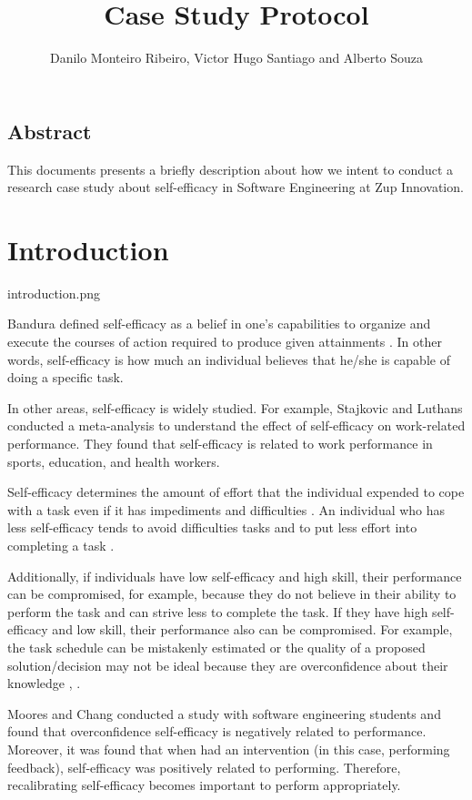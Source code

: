 \documentclass{TheMartianReport}
\title{Case Study Protocol} %
\author{Danilo Monteiro Ribeiro, Victor Hugo Santiago and Alberto Souza } %
\begin{document}

\subsection{Abstract}

This documents presents a briefly description  about how we intent to conduct a research case study about self-efficacy in Software Engineering at Zup Innovation. 

\section{Introduction}{introduction.png}

Bandura defined self-efficacy as a belief in one’s capabilities to organize and execute the courses of action required to produce given attainments \cite{bandura1977self}. In other words, self-efficacy is how much an individual believes that he/she is capable of doing a specific task.

In other areas, self-efficacy is widely studied. For example, Stajkovic and Luthans \cite{stajkovic1998self} conducted a meta-analysis to understand the effect of self-efficacy on work-related performance. They found that self-efficacy is related to work performance in sports, education, and health workers.

Self-efficacy determines the amount of effort that the individual expended to cope with a task even if it has impediments and difficulties \cite{bandura1977self}. An individual who has less self-efficacy tends to avoid difficulties tasks and to put less effort into completing a task \cite{artino2012academic}.

Additionally, if individuals have low self-efficacy and high skill, their performance can be compromised, for example, because they do not believe in their ability to perform the task and can strive less to complete the task. If they have high self-efficacy and low skill, their performance also can be compromised. For example, the task schedule can be mistakenly estimated or the quality of a proposed solution/decision may not be ideal because they are overconfidence about their knowledge \cite{vancouver2002two}, \cite{pajares1996self} \cite{schunk2009self}. 

Moores and Chang \cite{moores2009self} conducted a study with software engineering students and found that overconfidence self-efficacy is negatively related to performance. Moreover, it was found that when had an intervention (in this case, performing feedback), self-efficacy was positively related to performing. Therefore, recalibrating self-efficacy becomes important to perform appropriately.
\end{document}
